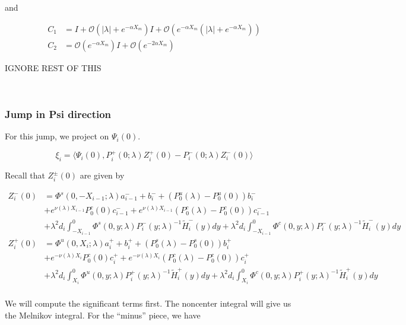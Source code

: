 \documentclass[12pt]{article}
\begin{document}
and

\begin{align*}
C_1 &= I + \mathcal{O}(|\lambda| + e^{-\alpha X_m}) I 
+ \mathcal{O}(e^{-\alpha X_m}( |\lambda| + e^{-\alpha X_m}))\\
C_2 &= \mathcal{O}(e^{-\alpha X_m}) I + \mathcal{O}(e^{-2 \alpha X_m})
\end{align*}

IGNORE REST OF THIS

\\

\subsubsection*{Jump in Psi direction}

For this jump, we project on $\Psi_i(0)$.

\[
\xi_i = \langle \Psi_i(0), P_i^+(0; \lambda) Z_i^+(0) - P_i^-(0; \lambda) Z_i^-(0) \rangle
\]

Recall that $Z_i^\pm(0)$ are given by

\begin{align*}
Z_i^-(0) &= \Phi^s(0, -X_{i-1}; \lambda) a_{i-1}^- + b_i^- + (P_0^u(\lambda) - P_0^u(0))b_i^- \\
&+ e^{\nu(\lambda) X_{i-1}} P_0^c(0) c_{i-1}^- + e^{\nu(\lambda) X_{i-1}} (P_0^c(\lambda) - P_0^c(0))c_{i-1}^- \\
&+ \lambda^2 d_i \int_{-X_{i-1}}^0 \Phi^s(0, y; \lambda) P_i^-(y; \lambda)^{-1} \tilde{H}_i^-(y) dy 
+ \lambda^2 d_i \int_{-X_{i-1}}^0 \Phi^c(0, y; \lambda) P_i^-(y; \lambda)^{-1} \tilde{H}_i^-(y) dy  \\ 
Z_i^+(0) &= \Phi^u(0, X_i; \lambda) a_i^+ + b_i^+ + (P_0^s(\lambda) - P_0^s(0)) b_i^+ \\
&+ e^{-\nu(\lambda)X_i} P_0^c(0) c_i^+ + e^{-\nu(\lambda)X_i} (P_0^c(\lambda) - P_0^c(0))c_i^+ \\
&+ \lambda^2 d_i \int_{X_i}^0 \Phi^u(0, y; \lambda) P_i^+(y; \lambda)^{-1} \tilde{H}_i^+(y) dy 
+ \lambda^2 d_i \int_{X_i}^0 \Phi^c(0, y; \lambda) P_i^+(y; \lambda)^{-1} \tilde{H}_i^+(y) dy \\
\end{align*}

We will compute the significant terms first. The noncenter integral will give us the Melnikov integral. For the ``minus'' piece, we have
\end{document}
